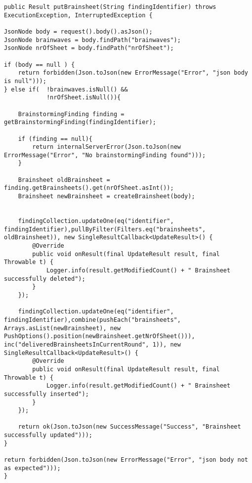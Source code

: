 \begin{lstlisting}[caption={PutBrainsheet vor Refactoring}, label=putBrainsheetVorRef]
public Result putBrainsheet(String findingIdentifier) throws ExecutionException, InterruptedException {

JsonNode body = request().body().asJson();
JsonNode brainwaves = body.findPath("brainwaves");
JsonNode nrOfSheet = body.findPath("nrOfSheet");

if (body == null ) {
    return forbidden(Json.toJson(new ErrorMessage("Error", "json body is null")));
} else if(  !brainwaves.isNull() &&
            !nrOfSheet.isNull()){

	BrainstormingFinding finding = getBrainstormingFinding(findingIdentifier);

    if (finding == null){
        return internalServerError(Json.toJson(new ErrorMessage("Error", "No brainstormingFinding found")));
    }

    Brainsheet oldBrainsheet = finding.getBrainsheets().get(nrOfSheet.asInt());
    Brainsheet newBrainsheet = createBrainsheet(body);


    findingCollection.updateOne(eq("identifier", findingIdentifier),pullByFilter(Filters.eq("brainsheets", oldBrainsheet)), new SingleResultCallback<UpdateResult>() {
        @Override
        public void onResult(final UpdateResult result, final Throwable t) {
            Logger.info(result.getModifiedCount() + " Brainsheet successfully deleted");
        }
    });

    findingCollection.updateOne(eq("identifier", findingIdentifier),combine(pushEach("brainsheets", Arrays.asList(newBrainsheet), new PushOptions().position(newBrainsheet.getNrOfSheet())), inc("deliveredBrainsheetsInCurrentRound", 1)), new SingleResultCallback<UpdateResult>() {
        @Override
        public void onResult(final UpdateResult result, final Throwable t) {
            Logger.info(result.getModifiedCount() + " Brainsheet successfully inserted");
        }
    });

    return ok(Json.toJson(new SuccessMessage("Success", "Brainsheet successfully updated")));
}

return forbidden(Json.toJson(new ErrorMessage("Error", "json body not as expected")));
}
\end{lstlisting}


